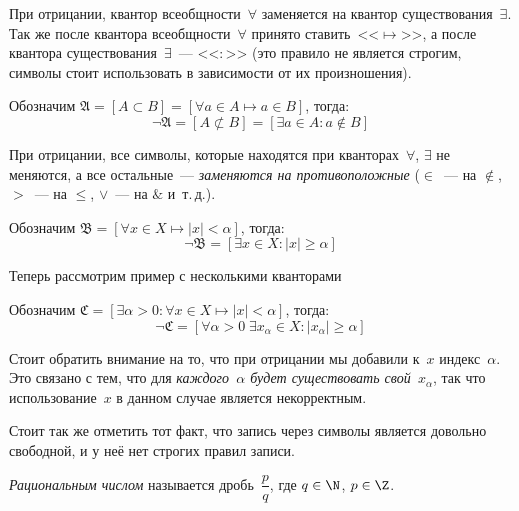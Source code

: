 \begin{example}
При отрицании, квантор всеобщности~\(\forall\) заменяется на квантор существования~\(\exists\). Так
же после квантора всеобщности~\(\forall\) принято ставить~<<\(\mapsto\)>>, а после квантора
существования~\(\exists\)~--- <<\(\colon\)>> (это правило не является строгим, символы стоит использовать в
зависимости от их произношения).

Обозначим \(\mathfrak{A} = \left[A \subset B\right] = \left[\forall a \in A \mapsto a \in B
\right]\), тогда:
\[
    \neg \mathfrak{A} = \left[A \not\subset B\right] =
    \left[\exists a \in A\colon a \notin B\right]
\]
\end{example}

\begin{example}
При отрицании, все символы, которые находятся при кванторах~\(\forall\), \(\exists\) не меняются,
а все остальные~--- \textit{заменяются на противоположные} (\(\in\)~--- на \(\notin\), \(>\)~--- на
\(\leq\), \(\lor\)~--- на \(\&\) и~т.\,д.).

Обозначим \(\mathfrak{B} = \left[\forall x \in X \mapsto \lvert x \rvert < \alpha \right]\), тогда:
\[
    \neg \mathfrak{B} = \left[\exists x \in X\colon \lvert x \rvert \ge \alpha\right]
\]
\end{example}

\begin{example}
Теперь рассмотрим пример с несколькими кванторами

Обозначим \(\mathfrak{C} = \left[\exists \alpha > 0\colon \forall x \in X \mapsto \lvert x \rvert <
\alpha\right]\), тогда:
\[
    \neg \mathfrak{C} = \left[ \forall \alpha > 0 \; \exists x_\alpha \in X\colon
    \lvert x_\alpha \rvert \geq \alpha\right]
\]

Стоит обратить внимание на то, что при отрицании мы добавили к~\(x\) индекс~\(\alpha\). Это связано
с тем, что для \textit{каждого~\(\alpha\) будет существовать свой~\(x_{\alpha}\)}, так что
использование~\(x\) в данном случае является некорректным.
\end{example}

Стоит так же отметить тот факт, что запись через символы является довольно свободной, и у неё нет
строгих правил записи.



\begin{definition}
\textit{Рациональным числом} называется дробь~\(\dfrac{p}{q}\), где \(q \in \N\), \(p \in \Z\).
\end{definition}


